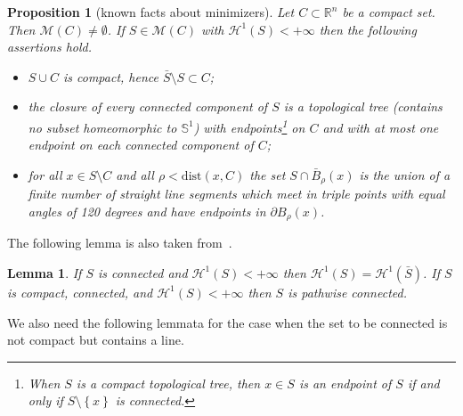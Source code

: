 \documentclass{amsart}
\newcommand{\RR}{\mathbb R}
\renewcommand{\H}{\mathcal H}
\newcommand{\ENCLOSE}[1]{\left\{#1\right\}}
\newcommand{\M}{\mathcal{M}}
\renewcommand{\H}{\mathcal{H}}
\newcommand{\dist}{\mathrm{dist}}
\newtheorem{proposition}[theorem]{Proposition}
\newtheorem{lemma}[theorem]{Lemma}
\theoremstyle{definition}
\theoremstyle{remark}
\begin{document}
\begin{proposition}[known facts about minimizers]\label{prop:PaoSte}
  Let $C\subset \RR^n$ be a compact set.
  Then $\M(C)\neq \emptyset$. If $S\in \M(C)$
  with $\H^1(S)<+\infty$
  then the following assertions hold.
  \begin{itemize}
    \item[(i)] $S\cup C$ is compact, 
    hence $\bar S \setminus S \subset C$;
    \item[(ii)] the closure of every connected component of $S$     
    is a topological tree 
    (contains no subset homeomorphic to $\mathbb S^1$)
    with endpoints\footnote{%
    When $S$ is a compact topological tree, then $x\in S$ is an endpoint 
    of $S$ if and only if $S\setminus \ENCLOSE{x}$ is connected.} 
    on $C$ and with at most one endpoint 
    on each connected component of $C$;
    \item[(iii)] for all $x\in S\setminus C$ and all 
    $\rho < \dist(x,C)$ the set $S\cap \bar B_\rho(x)$ 
    is the union of a finite number of straight line 
    segments which meet in triple points with equal 
    angles of 120 degrees and have endpoints in 
    $\partial B_\rho(x)$.
  \end{itemize}
\end{proposition}

The following lemma is also taken from~\cite[Proposition~2.2 and lemma~2.6]{PaoSte12}.

\begin{lemma}\label{lm:connected}
If $S$ is connected and $\H^1(S)<+\infty$ then $\H^1(S) = \H^1(\bar S)$.
If $S$ is compact, connected, and $\H^1(S)<+\infty$ then $S$ is 
pathwise connected.
\end{lemma}

We also need the following lemmata for the case when the set to 
be connected is not compact but contains a line.
\end{document}
